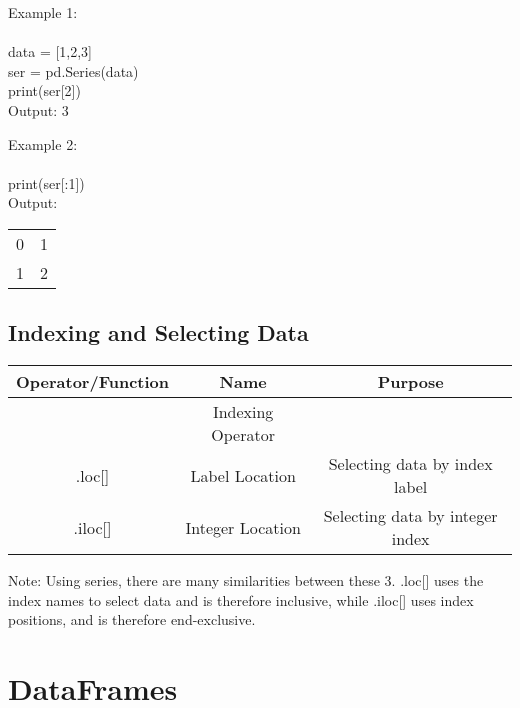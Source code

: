 \begin{center}
\begin{minipage}{0.45\textwidth}
        Example 1: \\
        \\[0.01cm]
        data = [1,2,3]\\
        ser = pd.Series(data)\\
        print(ser[2])\\
        Output: 3
\end{minipage}
\hspace{0.05\textwidth} %
\begin{minipage}{0.45\textwidth}
    Example 2:\\
    \\[0.01cm]
    print(ser[:1])\\
    Output:\\
    \begin{tabular}{c|c}
       0  &  1\\
        1 & 2
    \end{tabular}
    
\end{minipage}
\end{center}


\subsection{Indexing and Selecting Data}
\begin{center}
    \begin{tabular}{c|c|c}
        Operator/Function & Name & Purpose\\
        \hline
        [ ] &  Indexing Operator\\
         .loc[]&  Label Location & Selecting data by index label\\
         .iloc[] & Integer Location & Selecting data by integer index\\
    \end{tabular}
\end{center}

Note: Using series, there are many similarities between these 3. .loc[] uses the index names to select data and is therefore inclusive, while .iloc[] uses index positions, and is therefore end-exclusive.






\section{DataFrames}


